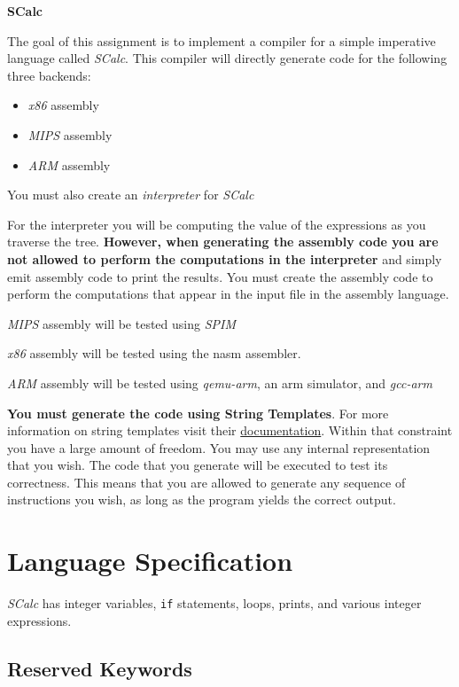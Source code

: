 \documentclass{article}
\newcommand{\code}[1]{\texttt{\textmd{#1}}}
\begin{document}
\ifpdf
	\LARGE
	\textbf{SCalc}
	\normalsize
\fi




The goal of this assignment is to implement a compiler for a simple imperative language called \textit{SCalc}. This
compiler will directly generate code for the following three backends:

\begin {itemize}
	\item \textit{x86} assembly
	\item \textit{MIPS} assembly
	\item \textit{ARM} assembly
\end {itemize}

You must also create an \textit{interpreter} for \textit{SCalc}

For the interpreter you will be computing the value of the expressions as you traverse the tree. \textbf{However, when
generating the assembly code you are not allowed to perform the computations in the interpreter} and simply emit
assembly code to print the results. You must create the assembly code to perform the computations that appear in the
input file in the assembly language.

\textit{MIPS} assembly will be tested using \textit{SPIM}

\textit{x86} assembly will be tested using the nasm assembler.

\textit{ARM} assembly will be tested using \textit{qemu-arm}, an arm simulator, and \textit{gcc-arm}

\textbf{You must generate the code using String Templates}. For more information on string templates visit their
\href{https://github.com/antlr/stringtemplate4/blob/master/doc/index.md}{documentation}. Within that
constraint you have a large amount of freedom. You may use any internal representation that you wish. The code that you
generate will be executed to test its correctness. This means that you are allowed to generate any sequence of instructions
you wish, as long as the program yields the correct output.


\section{Language Specification}
	\textit{SCalc} has integer variables, \code{if} statements, loops, prints, and various integer expressions.


	\subsection{Reserved Keywords}
\end{document}
